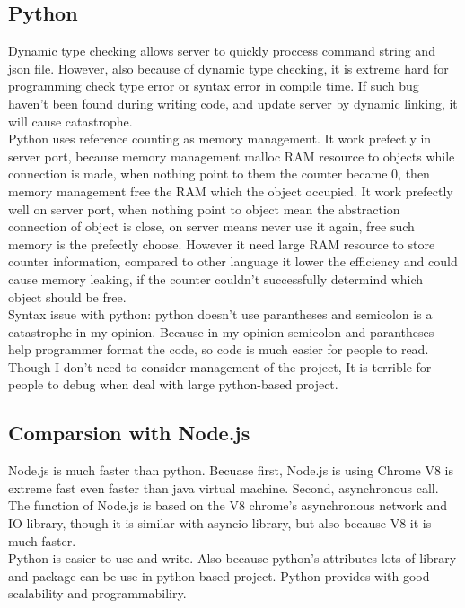 \documentclass[10pt, a4paper]{IEEEtran}
\begin{document}
    \subsection*{Python}
    Dynamic type checking allows server to quickly proccess command string and json file. However, also because of dynamic type checking, it is extreme hard for programming check type error or syntax error in compile time. If such bug haven't been found during writing code, and update server by dynamic linking, it will cause catastrophe.\\
    Python uses reference counting as memory management. It work prefectly in server port, because memory management malloc RAM resource to objects while connection is made, when nothing point to them the counter became 0, then memory management free the RAM which the object occupied. It work prefectly well on server port, when nothing point to object mean the abstraction connection of object is close, on server means never use it again, free such memory is the prefectly choose. However it need large RAM resource to store counter information, compared to other language it lower the efficiency and could cause memory leaking, if the counter couldn't successfully determind which object should be free.\\
    Syntax issue with python: python doesn't use parantheses and semicolon is a catastrophe in my opinion. Because in my opinion semicolon and parantheses help programmer format the code, so code is much easier for people to read. Though I don't need to consider management of the project, It is terrible for people to debug when deal with large python-based project.\\
    \subsection{Comparsion with Node.js}
    Node.js is much faster than python. Becuase first, Node.js is using Chrome V8 is extreme fast  even faster than java virtual machine. Second, asynchronous call. The function of Node.js is based on the V8 chrome's asynchronous network and IO library, though it is similar with asyncio library, but also because V8 it is much faster.\\
    Python is easier to use and write. Also because python's attributes lots of library and package can be use in python-based project. Python provides with good scalability and programmabiliry.
    
\end{document}
